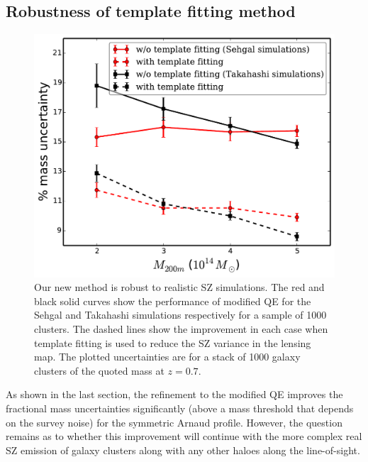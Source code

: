 {%
}\fi

\subsection{Robustness of template fitting method}
\label{subsec:simsz}
\begin{figure}[ht]
\includegraphics[width=\linewidth, keepaspectratio]{figs/Daisuke_Sehgal_results.pdf}
 \caption{
Our new method is robust to realistic SZ simulations. 
The red and black solid curves show the performance of modified QE for the Sehgal and Takahashi simulations respectively for a sample of 1000 clusters. 
The dashed lines show the improvement in each case when template fitting is used to reduce the SZ variance in the lensing map. 
The plotted uncertainties are for a stack of 1000 galaxy clusters of the quoted mass at $z=0.7$. 
 }
\label{fig:realistic_sims}
\end{figure}
As shown in the last section, the refinement to the modified QE improves the fractional mass uncertainties significantly (above a mass threshold that depends on the survey noise) for the symmetric Arnaud profile. 
However, the question remains as to whether this improvement will continue with the more complex real SZ emission of galaxy clusters along with any other haloes along the line-of-sight.

